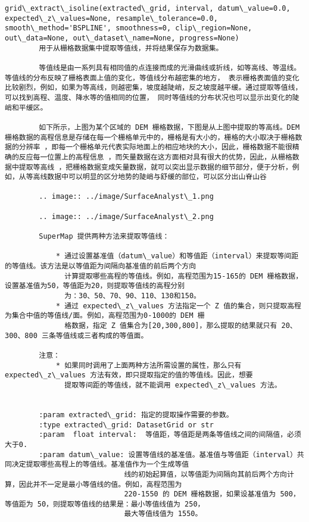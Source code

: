 \documentclass[11pt]{article}
\begin{document}
\begin{Verbatim}[commandchars=\\\{\}]
    grid\_extract\_isoline(extracted\_grid, interval, datum\_value=0.0, expected\_z\_values=None, resample\_tolerance=0.0, smooth\_method='BSPLINE', smoothness=0, clip\_region=None, out\_data=None, out\_dataset\_name=None, progress=None)
        用于从栅格数据集中提取等值线，并将结果保存为数据集。
        
        等值线是由一系列具有相同值的点连接而成的光滑曲线或折线，如等高线、等温线。等值线的分布反映了栅格表面上值的变化，等值线分布越密集的地方， 表示栅格表面值的变化比较剧烈，例如，如果为等高线，则越密集，坡度越陡峭，反之坡度越平缓。通过提取等值线，可以找到高程、温度、降水等的值相同的位置， 同时等值线的分布状况也可以显示出变化的陡峭和平缓区。
        
        如下所示，上图为某个区域的 DEM 栅格数据，下图是从上图中提取的等高线。DEM 栅格数据的高程信息是存储在每一个栅格单元中的，栅格是有大小的，栅格的大小取决于栅格数据的分辨率 ，即每一个栅格单元代表实际地面上的相应地块的大小，因此，栅格数据不能很精确的反应每一位置上的高程信息 ，而矢量数据在这方面相对具有很大的优势，因此，从栅格数据中提取等高线 ，把栅格数据变成矢量数据，就可以突出显示数据的细节部分，便于分析，例如，从等高线数据中可以明显的区分地势的陡峭与舒缓的部位，可以区分出山脊山谷
        
        .. image:: ../image/SurfaceAnalyst\_1.png
        
        .. image:: ../image/SurfaceAnalyst\_2.png
        
        SuperMap 提供两种方法来提取等值线：
        
            * 通过设置基准值（datum\_value）和等值距（interval）来提取等间距的等值线。该方法是以等值距为间隔向基准值的前后两个方向
              计算提取哪些高程的等值线。例如，高程范围为15-165的 DEM 栅格数据，设置基准值为50，等值距为20，则提取等值线的高程分别
              为：30、50、70、90、110、130和150。
            * 通过 expected\_z\_values 方法指定一个 Z 值的集合，则只提取高程为集合中值的等值线/面。例如，高程范围为0-1000的 DEM 栅
              格数据，指定 Z 值集合为[20,300,800]，那么提取的结果就只有 20、300、800 三条等值线或三者构成的等值面。
        
        注意：
            * 如果同时调用了上面两种方法所需设置的属性，那么只有 expected\_z\_values 方法有效，即只提取指定的值的等值线。因此，想要
              提取等间距的等值线，就不能调用 expected\_z\_values 方法。
        
        
        :param extracted\_grid: 指定的提取操作需要的参数。
        :type extracted\_grid: DatasetGrid or str
        :param  float interval:  等值距，等值距是两条等值线之间的间隔值，必须大于0.
        :param datum\_value: 设置等值线的基准值。基准值与等值距（interval）共同决定提取哪些高程上的等值线。基准值作为一个生成等值
                            线的初始起算值，以等值距为间隔向其前后两个方向计算，因此并不一定是最小等值线的值。例如，高程范围为
                            220-1550 的 DEM 栅格数据，如果设基准值为 500，等值距为 50，则提取等值线的结果是：最小等值线值为 250，
                            最大等值线值为 1550。
        

\end{Verbatim}
\end{document}
